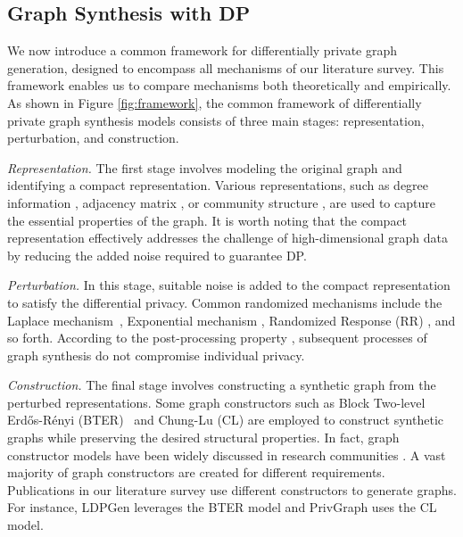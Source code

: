 \documentclass[conference]{IEEEtran}
\theoremstyle{plain}
\begin{document}
\subsection{Graph Synthesis with DP}
We now introduce a common framework for differentially private graph generation, designed to encompass all mechanisms of our literature survey.
This framework enables us to compare mechanisms both theoretically and empirically.
As shown in Figure \ref{fig:framework}, the common framework of differentially private graph synthesis models consists of three main stages: representation, perturbation, and construction.

\textit{Representation.}
The first stage involves modeling the original graph and identifying a compact representation. 
Various representations, such as degree information \cite{wang2013preserving,qin2017generating,ye2020lf}, adjacency matrix \cite{nguyen2015differentially,chen2014correlated,mir2012differentially}, or community structure \cite{yuan2023privgraph,ju2019generating,chen2019publishing,liu2020local}, are used to capture the essential properties of the graph. 
It is worth noting that the compact representation effectively addresses the challenge of high-dimensional graph data by reducing the added noise required to guarantee DP.

\textit{Perturbation.}
In this stage, suitable noise is added to the compact representation to satisfy the differential privacy.
Common randomized mechanisms include the Laplace mechanism~\cite{dwork2006calibrating}, Exponential mechanism \cite{mcsherry2007mechanism}, Randomized Response (RR) \cite{warner1965randomized}, and so forth.
According to the post-processing property \cite{dwork2014algorithmic}, subsequent processes of graph synthesis do not compromise individual privacy.

\textit{Construction.}
The final stage involves constructing a synthetic graph from the perturbed representations. 
Some graph constructors such as Block Two-level Erdős-Rényi (BTER)~\cite{seshadhri2012community} and Chung-Lu (CL) \cite{aiello2000random} are employed to construct synthetic graphs while preserving the desired structural properties.
In fact, graph constructor models have been widely discussed in research communities \cite{bonifati2020graph}.
A vast majority of graph constructors are created for different requirements.
Publications in our literature survey use different constructors to generate graphs.
For instance, LDPGen \cite{qin2017generating} leverages the BTER model and PrivGraph \cite{yuan2023privgraph} uses the CL model. 
\end{document}
